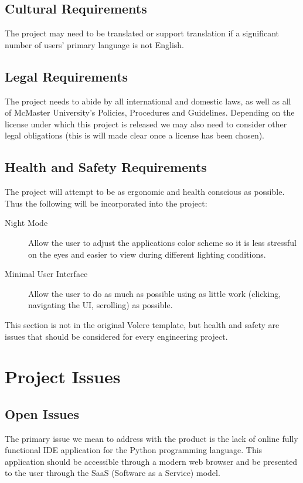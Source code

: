 \documentclass[12pt, titlepage]{article}
\begin{document}
  \subsection{Cultural Requirements}
  The project may need to be translated or support translation if a significant
  number of users' primary language is not English.

  \subsection{Legal Requirements}
	The project needs to abide by all international and domestic laws, as well as
	all of McMaster University's Policies, Procedures and Guidelines. Depending
	on the license under which this project is released we may also need to
	consider other legal obligations (this is will made clear once a license has
	been chosen).

  \subsection{Health and Safety Requirements}
	The project will attempt to be as ergonomic and health conscious as possible.
	Thus the following will be incorporated into the project:
	\begin{description}
		\item [Night Mode] Allow the user to adjust the applications color scheme
			so it is less stressful on the eyes and easier to view during different
			lighting conditions.
		\item [Minimal User Interface] Allow the user to do as much as possible
			using as little work (clicking, navigating the UI, scrolling) as
			possible.
	\end{description}

	This section is not in the original Volere template, but health and safety
	are issues that should be considered for every engineering project.

\section{Project Issues}

  \subsection{Open Issues}
	The primary issue we mean to address with the product is the lack of online
	fully functional IDE application for the Python programming language. This
	application should be accessible through a modern web browser and be
	presented to the user through the SaaS (Software as a Service) model.
\end{document}
